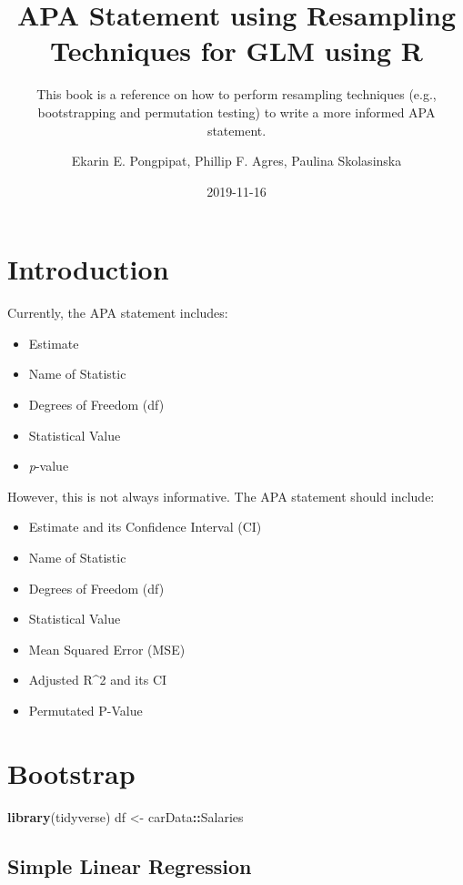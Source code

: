 \documentclass[]{book}
\title{APA Statement using Resampling Techniques for GLM using R}
\subtitle{This book is a reference on how to perform resampling techniques (e.g., bootstrapping and permutation testing) to write a more informed APA statement.}
\author{Ekarin E. Pongpipat, Phillip F. Agres, Paulina Skolasinska}
\date{2019-11-16}
\newenvironment{Shaded}{\begin{snugshade}}{\end{snugshade}}
\newcommand{\KeywordTok}[1]{\textcolor[rgb]{0.13,0.29,0.53}{\textbf{#1}}}
\newcommand{\NormalTok}[1]{#1}
\newcommand{\OperatorTok}[1]{\textcolor[rgb]{0.81,0.36,0.00}{\textbf{#1}}}
\newcommand{\StringTok}[1]{\textcolor[rgb]{0.31,0.60,0.02}{#1}}
\providecommand{\tightlist}{%
  \setlength{\itemsep}{0pt}\setlength{\parskip}{0pt}}
\begin{document}
\maketitle

{
\setcounter{tocdepth}{1}
\tableofcontents
}
\hypertarget{introduction}{%
\chapter{Introduction}\label{introduction}}

Currently, the APA statement includes:

\begin{itemize}
\tightlist
\item
  Estimate
\item
  Name of Statistic
\item
  Degrees of Freedom (df)
\item
  Statistical Value
\item
  \emph{p}-value
\end{itemize}

However, this is not always informative. The APA statement should include:

\begin{itemize}
\tightlist
\item
  Estimate and its Confidence Interval (CI)
\item
  Name of Statistic
\item
  Degrees of Freedom (df)
\item
  Statistical Value
\item
  Mean Squared Error (MSE)
\item
  Adjusted R\^{}2 and its CI
\item
  Permutated P-Value
\end{itemize}

\hypertarget{bootstrap}{%
\chapter{Bootstrap}\label{bootstrap}}

\begin{Shaded}
\begin{Highlighting}[]
\KeywordTok{library}\NormalTok{(tidyverse)}
\NormalTok{df <-}\StringTok{ }\NormalTok{carData}\OperatorTok{::}\NormalTok{Salaries}
\end{Highlighting}
\end{Shaded}

\hypertarget{simple-linear-regression}{%
\section{Simple Linear Regression}\label{simple-linear-regression}}
\end{document}
